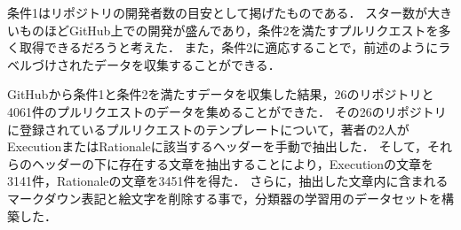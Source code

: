 条件1はリポジトリの開発者数の目安として掲げたものである．
スター数が大きいものほどGitHub上での開発が盛んであり，条件2を満たすプルリクエストを多く取得できるだろうと考えた．
また，条件2に適応することで，前述のようにラベルづけされたデータを収集することができる．

GitHubから条件1と条件2を満たすデータを収集した結果，26のリポジトリと4061件のプルリクエストのデータを集めることができた．
その26のリポジトリに登録されているプルリクエストのテンプレートについて，著者の2人がExecutionまたはRationaleに該当するヘッダーを手動で抽出した．
そして，それらのヘッダーの下に存在する文章を抽出することにより，Executionの文章を3141件，Rationaleの文章を3451件を得た．
さらに，抽出した文章内に含まれるマークダウン表記と絵文字を削除する事で，分類器の学習用のデータセットを構築した．






